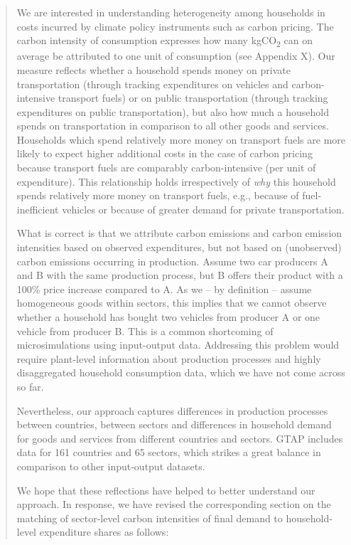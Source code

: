 \documentclass[11pt]{article}
\newenvironment{response}
{\begin{quote}\color{black}}
{\end{quote}}
\begin{document}
\begin{response}
    We are interested in understanding heterogeneity among households in costs incurred by climate policy instruments such as carbon pricing. The carbon intensity of consumption expresses how many kgCO\textsubscript{2} can on average be attributed to one unit of consumption (see Appendix X). Our measure reflects whether a household spends money on private transportation (through tracking expenditures on vehicles and carbon-intensive transport fuels) or on public transportation (through tracking expenditures on public transportation), but also how much a household spends on transportation in comparison to all other goods and services. Households which spend relatively more money on transport fuels are more likely to expect higher additional costs in the case of carbon pricing because transport fuels are comparably carbon-intensive (per unit of expenditure). This relationship holds irrespectively of \textit{why} this household spends relatively more money on transport fuels, e.g., because of fuel-inefficient vehicles or because of greater demand for private transportation.

    What is correct is that we attribute carbon emissions and carbon emission intensities based on observed expenditures, but not based on (unobserved) carbon emissions occurring in production. Assume two car producers A and B with the same production process, but B offers their product with a 100\% price increase compared to A. As we -- by definition -- assume homogeneous goods within sectors, this implies that we cannot observe whether a household has bought two vehicles from producer A or one vehicle from producer B. This is a common shortcoming of microsimulations using input-output data. Addressing this problem would require plant-level information about production processes and highly disaggregated household consumption data, which we have not come across so far. 
    
    Nevertheless, our approach captures differences in production processes between countries, between sectors and differences in household demand for goods and services from different countries and sectors. GTAP includes data for 161 countries and 65 sectors, which strikes a great balance in comparison to other input-output datasets.

    We hope that these reflections have helped to better understand our approach. In response, we have revised the corresponding section on the matching of sector-level carbon intensities of final demand to household-level expenditure shares as follows:
    
\end{response}
\end{document}
